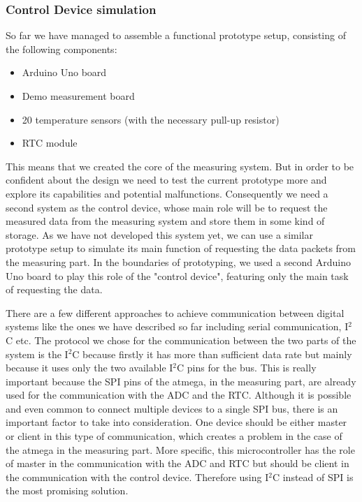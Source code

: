 \subsubsection{Control Device simulation}
So far we have managed to assemble a functional prototype setup, consisting of the following components:

\begin{itemize}
    \item Arduino Uno board
    \item Demo measurement board
    \item 20 temperature sensors (with the necessary pull-up resistor)
    \item RTC module
\end{itemize}

This means that we created the core of the measuring system. But in order to be confident about the design we need to test the current prototype more and explore its capabilities and potential malfunctions. Consequently we need a second system as the control device, whose main role will be to request the measured data from the measuring system and store them in some kind of storage. As we have not developed this system yet, we can use a similar prototype setup to simulate its main function of requesting the data packets from the measuring part. In the boundaries of prototyping, we used a second Arduino Uno board to play this role of the "control device", featuring only the main task of requesting the data.

There are a few different approaches to achieve communication between digital systems like the ones we have described so far including serial communication, I$^2$C etc. The protocol we chose for the communication between the two parts of the system is the I$^2$C because firstly it has more than sufficient data rate but mainly because it uses only the two available I$^2$C pins for the bus. This is really important because the SPI pins of the atmega, in the measuring part, are already used for the communication with the ADC and the RTC. Although it is possible and even common to connect multiple devices to a single SPI bus, there is an important factor to take into consideration. One device should be either master or client in this type of communication, which creates a problem in the case of the atmega in the measuring part. More specific, this microcontroller has the role of master in the communication with the ADC and RTC but should be client in the communication with the control device. Therefore using I$^2$C instead of SPI is the most promising solution.

